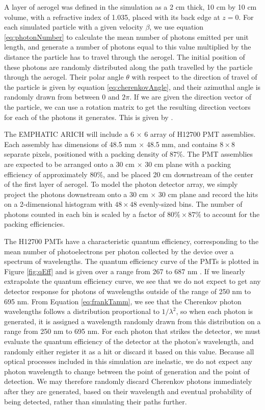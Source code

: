 A layer of aerogel was defined in the simulation as a 2 cm thick, 10 cm by 10 cm volume, with a refractive index of 1.035, placed with its back edge at $z=0$.
For each simulated particle with a given velocity $\beta$, we use equation \ref{eq:photonNumber} to calculate the mean number of photons emitted per unit length, and generate a number of photons equal to this value multiplied by the distance the particle has to travel through the aerogel.
The initial position of these photons are randomly distributed along the path travelled by the particle through the aerogel.
Their polar angle $\theta$ with respect to the direction of travel of the particle is given by equation \ref{eq:cherenkovAngle}, and their azimuthal angle is randomly drawn from between 0 and $2\pi$.
If we are given the direction vector of the particle, we can use a rotation matrix to get the resulting direction vectors for each of the photons it generates.
This is given by .

The EMPHATIC ARICH will include a 6 $\times$ 6 array of H12700 PMT assemblies. 
Each assembly has dimensions of 48.5 mm $\times$ 48.5 mm, and contains $8 \times 8$ separate pixels, positioned with a packing density of 87\%. 
The PMT assemblies are expected to be arranged onto a 30 cm $\times$ 30 cm plane with a packing efficiency of approximately $80\%$, and be placed 20 cm downstream of the center of the first layer of aerogel.
To model the photon detector array, we simply project the photons downstream onto a 30 cm $\times$ 30 cm plane and record the hits on a 2-dimensional histogram with $48 \times 48$ evenly-sized bins.
The number of photons counted in each bin is scaled by a factor of $80\% \times 87\%$ to account for the packing efficiencies.

The H12700 PMTs have a characteristic quantum efficiency, corresponding to the mean number of photoelectrons per photon collected by the device over a spectrum of wavelengths.
The quantum efficiency curve of the PMTs is plotted in Figure \ref{fig:qEff} and is given over a range from 267 to 687 nm  \cite{H12700} .
If we linearly extrapolate the quantum efficiency curve, we see that we do not expect to get any detector response for photons of wavelengths outside of the range of 250 nm to 695 nm.
From Equation \ref{eq:frankTamm}, we see that the Cherenkov photon wavelengths follows a distribution proportional to $1/\lambda^2$, so when each photon is generated, it is assigned a wavelength randomly drawn from this distribution on a range from 250 nm to 695 nm.
For each photon that strikes the detector, we must evaluate the quantum efficiency of the detector at the photon's wavelength, and randomly either register it as a hit or discard it based on this value.
Because all optical processes included in this simulation are inelastic, we do not expect any photon wavelength to change between the point of generation and the point of detection.
We may therefore randomly discard Cherenkov photons immediately after they are generated, based on their wavelength and eventual probability of being detected, rather than simulating their paths further.

